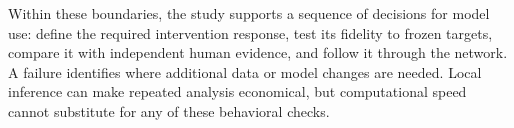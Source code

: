 Within these boundaries, the study supports a sequence of decisions for model use: define the required intervention response, test its fidelity to frozen targets, compare it with independent human evidence, and follow it through the network. A failure identifies where additional data or model changes are needed. Local inference can make repeated analysis economical, but computational speed cannot substitute for any of these behavioral checks.
